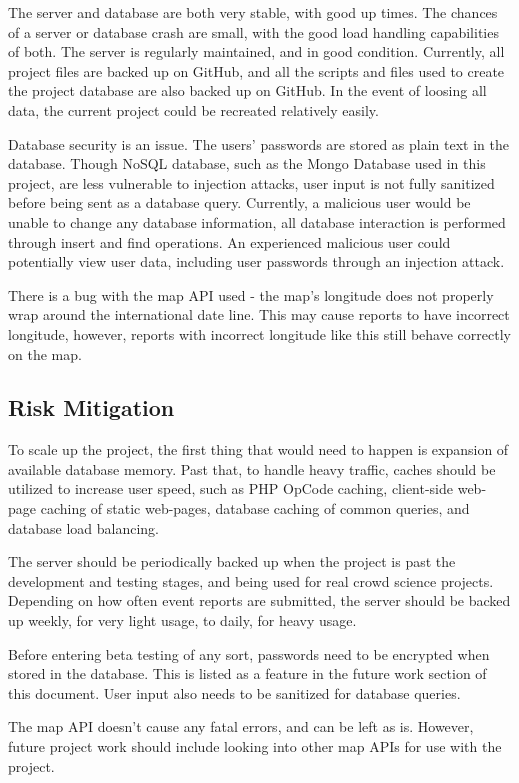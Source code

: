 The server and database are both very stable, with good up times. The chances of a server or database crash are small, with the good load handling capabilities of both. The server is regularly maintained, and in good condition. Currently, all project files are backed up on GitHub, and all the scripts and files used to create the project database are also backed up on GitHub. In the event of loosing all data, the current project could be recreated relatively easily.

Database security is an issue. The users' passwords are stored as plain text in the database.  Though NoSQL database, such as the Mongo Database used in this project, are less vulnerable to injection attacks, user input is not fully sanitized before being sent as a database query. Currently, a malicious user would be unable to change any database information, all database interaction is performed through insert and find operations. An experienced malicious user could potentially view user data, including user passwords through an injection attack. 

There is a bug with the map API used - the map's longitude does not properly wrap around the international date line. This may cause reports to have incorrect longitude, however, reports with incorrect longitude like this still behave correctly on the map.

\subsection{Risk Mitigation}
To scale up the project, the first thing that would need to happen is expansion of available database memory. Past that, to handle heavy traffic, caches should be utilized to increase user speed, such as PHP OpCode caching, client-side web-page caching of static web-pages, database caching of common queries, and database load balancing. 

The server should be periodically backed up when the project is past the development and testing stages, and being used for real crowd science projects. Depending on how often event reports are submitted, the server should be backed up weekly, for very light usage, to daily, for heavy usage. 

Before entering beta testing of any sort, passwords need to be encrypted when stored in the database. This is listed as a feature in the future work section of this document. User input also needs to be sanitized for database queries. 

The map API doesn't cause any fatal errors, and can be left as is. However, future project work should include looking into other map APIs for use with the project.

